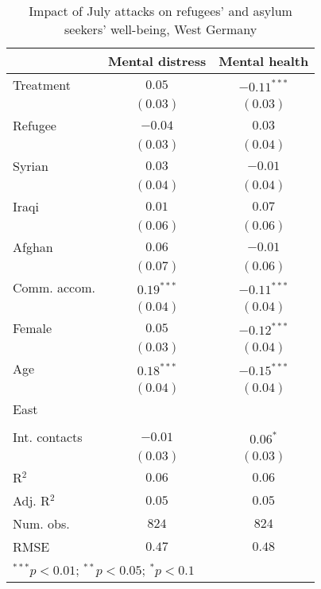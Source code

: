 
\begin{table}
\caption{Impact of July attacks on refugees' and asylum seekers' well-being, West Germany}
\begin{center}
\begin{tabular}{l c c}
\toprule
 & Mental distress & Mental health \\
\midrule
Treatment     & $0.05$       & $-0.11^{***}$ \\
              & $(0.03)$     & $(0.03)$      \\
Refugee       & $-0.04$      & $0.03$        \\
              & $(0.03)$     & $(0.04)$      \\
Syrian        & $0.03$       & $-0.01$       \\
              & $(0.04)$     & $(0.04)$      \\
Iraqi         & $0.01$       & $0.07$        \\
              & $(0.06)$     & $(0.06)$      \\
Afghan        & $0.06$       & $-0.01$       \\
              & $(0.07)$     & $(0.06)$      \\
Comm. accom.  & $0.19^{***}$ & $-0.11^{***}$ \\
              & $(0.04)$     & $(0.04)$      \\
Female        & $0.05$       & $-0.12^{***}$ \\
              & $(0.03)$     & $(0.04)$      \\
Age           & $0.18^{***}$ & $-0.15^{***}$ \\
              & $(0.04)$     & $(0.04)$      \\
East          &              &               \\
              &              &               \\
Int. contacts & $-0.01$      & $0.06^{*}$    \\
              & $(0.03)$     & $(0.03)$      \\
\midrule
R$^2$         & $0.06$       & $0.06$        \\
Adj. R$^2$    & $0.05$       & $0.05$        \\
Num. obs.     & $824$        & $824$         \\
RMSE          & $0.47$       & $0.48$        \\
\bottomrule
\multicolumn{3}{l}{\scriptsize{$^{***}p<0.01$; $^{**}p<0.05$; $^{*}p<0.1$}}
\end{tabular}
\label{tab_mhealth_west}
\end{center}
\end{table}
